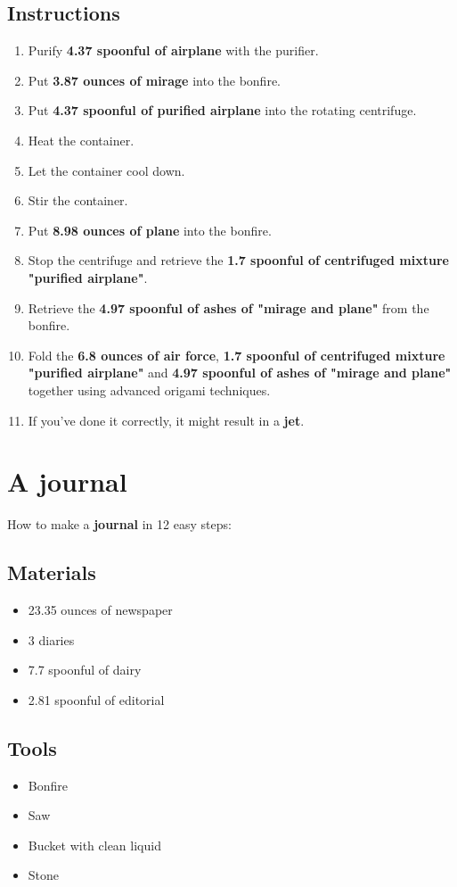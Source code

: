 \documentclass{article}
\begin{document}
\subsection{Instructions}\begin{enumerate}
\item 
Purify \textbf{4.37 spoonful of airplane} with the purifier.
\item 
Put \textbf{3.87 ounces of mirage} into the bonfire.
\item 
Put \textbf{4.37 spoonful of purified airplane} into the rotating centrifuge.
\item 
Heat the container.
\item 
Let the container cool down.
\item 
Stir the container.
\item 
Put \textbf{8.98 ounces of plane} into the bonfire.
\item 
Stop the centrifuge and retrieve the \textbf{1.7 spoonful of centrifuged mixture "purified airplane"}.
\item 
Retrieve the \textbf{4.97 spoonful of ashes of "mirage and plane"} from the bonfire.
\item 
Fold the \textbf{6.8 ounces of air force}, \textbf{1.7 spoonful of centrifuged mixture "purified airplane"} and \textbf{4.97 spoonful of ashes of "mirage and plane"} together using advanced origami techniques.
\item 
If you've done it correctly, it might result in a \textbf{jet}.
\end{enumerate}
\newpage
\section{A journal}How to make a \textbf{journal} in 12 easy steps:

\subsection{Materials}\begin{itemize}
\item 
23.35 ounces of newspaper
\item 
3 diaries
\item 
7.7 spoonful of dairy
\item 
2.81 spoonful of editorial
\end{itemize}
\subsection{Tools}\begin{itemize}
\item 
Bonfire
\item 
Saw
\item 
Bucket with clean liquid
\item 
Stone
\end{itemize}
\end{document}
